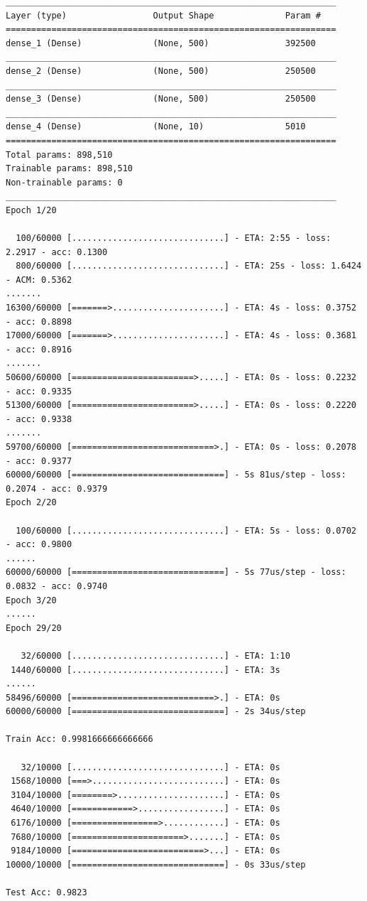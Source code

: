 \documentclass[a4paper,12pt]{article}
\begin{document}
\begin{enumerate}
\begin{lstlisting}
\end{lstlisting}

\begin{verbatim}
_________________________________________________________________
Layer (type)                 Output Shape              Param #
=================================================================
dense_1 (Dense)              (None, 500)               392500
_________________________________________________________________
dense_2 (Dense)              (None, 500)               250500
_________________________________________________________________
dense_3 (Dense)              (None, 500)               250500
_________________________________________________________________
dense_4 (Dense)              (None, 10)                5010
=================================================================
Total params: 898,510
Trainable params: 898,510
Non-trainable params: 0
_________________________________________________________________
Epoch 1/20

  100/60000 [..............................] - ETA: 2:55 - loss: 2.2917 - acc: 0.1300
  800/60000 [..............................] - ETA: 25s - loss: 1.6424 - ACM: 0.5362
.......
16300/60000 [=======>......................] - ETA: 4s - loss: 0.3752 - acc: 0.8898
17000/60000 [=======>......................] - ETA: 4s - loss: 0.3681 - acc: 0.8916
.......
50600/60000 [========================>.....] - ETA: 0s - loss: 0.2232 - acc: 0.9335
51300/60000 [========================>.....] - ETA: 0s - loss: 0.2220 - acc: 0.9338
.......
59700/60000 [============================>.] - ETA: 0s - loss: 0.2078 - acc: 0.9377
60000/60000 [==============================] - 5s 81us/step - loss: 0.2074 - acc: 0.9379
Epoch 2/20

  100/60000 [..............................] - ETA: 5s - loss: 0.0702 - acc: 0.9800
......
60000/60000 [==============================] - 5s 77us/step - loss: 0.0832 - acc: 0.9740
Epoch 3/20
......
Epoch 29/20

   32/60000 [..............................] - ETA: 1:10
 1440/60000 [..............................] - ETA: 3s
......
58496/60000 [============================>.] - ETA: 0s
60000/60000 [==============================] - 2s 34us/step

Train Acc: 0.9981666666666666

   32/10000 [..............................] - ETA: 0s
 1568/10000 [===>..........................] - ETA: 0s
 3104/10000 [========>.....................] - ETA: 0s
 4640/10000 [============>.................] - ETA: 0s
 6176/10000 [=================>............] - ETA: 0s
 7680/10000 [======================>.......] - ETA: 0s
 9184/10000 [==========================>...] - ETA: 0s
10000/10000 [==============================] - 0s 33us/step

Test Acc: 0.9823
\end{verbatim}


\newpage
\end{enumerate}
\end{document}
